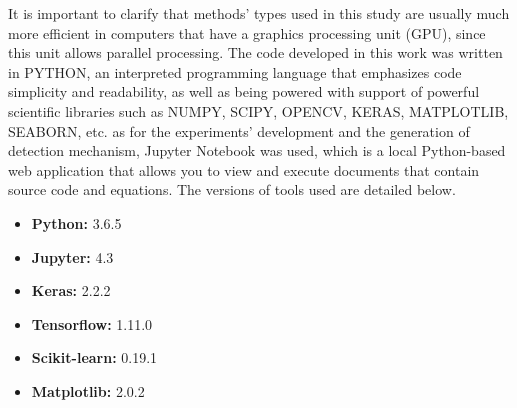 It is important to clarify that methods' types used in this study are usually much more efficient in computers that have a graphics processing unit (GPU), since this unit allows parallel processing. The code developed in this work was written in \textsc{PYTHON}, an interpreted programming language that emphasizes code simplicity and readability, as well as being powered with support of powerful scientific libraries such as \textsc{NUMPY}, \textsc{SCIPY}, \textsc{OPENCV}, \textsc{KERAS}, \textsc{MATPLOTLIB}, \textsc{SEABORN}, etc. as for the experiments' development and the generation of detection mechanism, Jupyter Notebook was used, which is a local Python-based web application that allows you to view and execute documents that contain source code and equations. The versions of tools used are detailed below.

\begin{itemize}
\item \textbf{Python:} 3.6.5

\item \textbf{Jupyter:} 4.3

\item \textbf{Keras:} 2.2.2

\item \textbf{Tensorflow:} 1.11.0

\item \textbf{Scikit-learn:} 0.19.1

\item \textbf{Matplotlib:} 2.0.2
\end{itemize}

